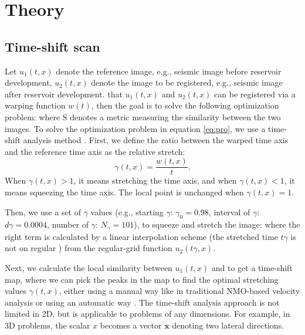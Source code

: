 \section{Theory}
\subsection{Time-shift scan}
Let $u_1(t,x)$ denote the reference image, e.g., seismic image before reservoir development,  $u_2(t,x)$ denote the image to be registered, e.g., seismic image after reservoir development.  that $u_1(t,x)$ and $u_2(t,x)$ can be registered via a warping function $w(t)$, then
the goal is to solve the following optimization problem:
where $\text{S}$ denotes a metric measuring the similarity between the two images. To solve the optimization problem in equation \ref{eq:pro}, we use a time-shift analysis method \cite[]{fomel20094}. First, we define the ratio between the warped time axis and the reference time axis as the relative stretch:
\begin{equation}
\label{eq:str}
\gamma(t,x)=\frac{w(t,x)}{t}.
\end{equation}
When $\gamma(t,x)>1$, it means stretching the time axis, and when $\gamma(t,x)<1$, it means squeezing the time axis. The local point is unchanged when $\gamma(t,x)=1$. 

Then, we use a set of $\gamma$ values (e.g., starting $\gamma$: $\gamma_0=0.98$, interval of $\gamma$: $d\gamma=0.0004$, number of $\gamma$: $N_\gamma=101$), to squeeze and stretch the image:
where the right term is calculated by a linear interpolation scheme (the stretched time $t\gamma$ is not on  regular ) from the regular-grid function $u_2(t\gamma,x)$. 


Next, we calculate the local similarity between $u_1(t,x)$ and  to get a time-shift map, where we can pick the peaks in the map to find the optimal stretching values $\gamma(t,x)$, either using a manual way like in traditional NMO-based velocity analysis or using an automatic way \cite[]{fomel20091}. The time-shift analysis approach is not limited in 2D, but is applicable to problems of any dimensions. For example, in 3D problems, the scalar $x$ becomes a vector $\mathbf{x}$ denoting two lateral directions.

